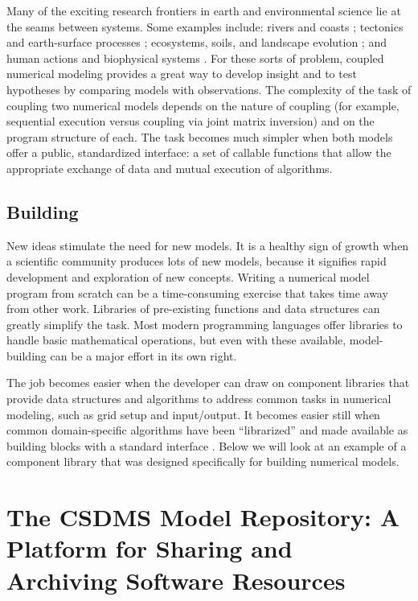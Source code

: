 \documentclass[12pt]{amsart}
\begin{document}
Many of the exciting research frontiers in earth and environmental science lie at the seams between systems. Some examples include: rivers and coasts \citep[e.g.,][]{ratliff2018exploring}; tectonics and earth-surface processes \citep[e.g.,][]{roy2016dynamic}; ecosystems, soils, and landscape evolution \citep[e.g.,][]{istanbulluoglu2005vegetation,pelletier2017way,lyons2020speciesevolver}; and human actions and biophysical systems \citep[e.g.,][]{robinson2018modelling}. For these sorts of problem, coupled numerical modeling provides a great way to develop insight and to test hypotheses by comparing models with observations. The complexity of the task of coupling two numerical models depends on the nature of coupling (for example, sequential execution versus coupling via joint matrix inversion) and on the program structure of each. The task becomes much simpler when both models offer a public, standardized interface: a set of callable functions that allow the appropriate exchange of data and mutual execution of algorithms.

\subsection{Building}\label{sec:build}

New ideas stimulate the need for new models. It is a healthy sign of growth when a scientific community produces lots of new models, because it signifies rapid development and exploration of new concepts. Writing a numerical model program from scratch can be a time-consuming exercise that takes time away from other work. Libraries of pre-existing functions and data structures can greatly simplify the task. Most modern programming languages offer libraries to handle basic mathematical operations, but even with these available, model-building can be a major effort in its own right. 

The job becomes easier when the developer can draw on component libraries that provide data structures and algorithms to address common tasks in numerical modeling, such as grid setup and input/output. It becomes easier still when common domain-specific algorithms have been ``librarized'' and made available as building blocks with a standard interface \citep[e.g.,][]{brown2014run}. Below we will look at an example of a component library that was designed specifically for building numerical models.



\section{The CSDMS Model Repository: A Platform for Sharing and Archiving Software Resources}
\end{document}
